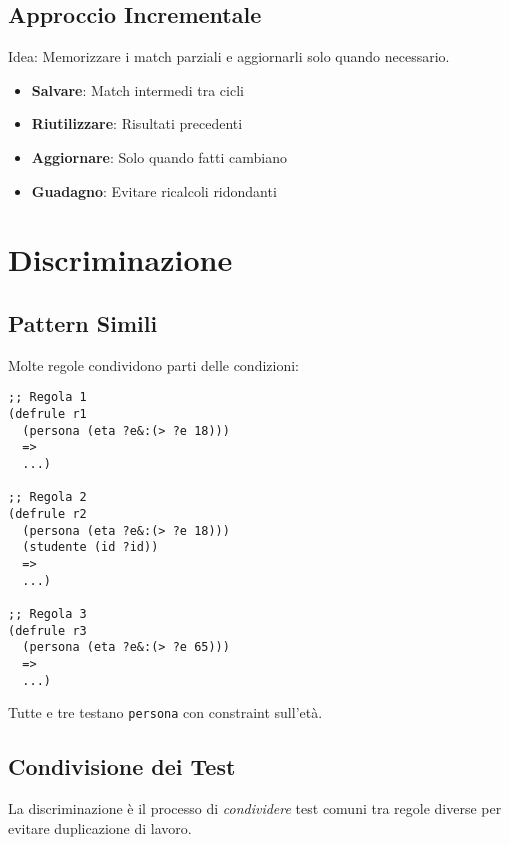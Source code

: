 \subsection{Approccio Incrementale}

Idea: Memorizzare i match parziali e aggiornarli solo quando necessario.

\begin{infobox}
\begin{itemize}
\item \textbf{Salvare}: Match intermedi tra cicli
\item \textbf{Riutilizzare}: Risultati precedenti
\item \textbf{Aggiornare}: Solo quando fatti cambiano
\item \textbf{Guadagno}: Evitare ricalcoli ridondanti
\end{itemize}
\end{infobox}

\section{Discriminazione}

\subsection{Pattern Simili}

Molte regole condividono parti delle condizioni:

\begin{lstlisting}[language=CLIPS]
;; Regola 1
(defrule r1
  (persona (eta ?e&:(> ?e 18)))
  =>
  ...)

;; Regola 2  
(defrule r2
  (persona (eta ?e&:(> ?e 18)))
  (studente (id ?id))
  =>
  ...)

;; Regola 3
(defrule r3
  (persona (eta ?e&:(> ?e 65)))
  =>
  ...)
\end{lstlisting}

Tutte e tre testano \texttt{persona} con constraint sull'età.

\subsection{Condivisione dei Test}

\begin{definizione}[Discriminazione]
La discriminazione è il processo di \textit{condividere} test comuni tra regole diverse per evitare duplicazione di lavoro.
\end{definizione}

